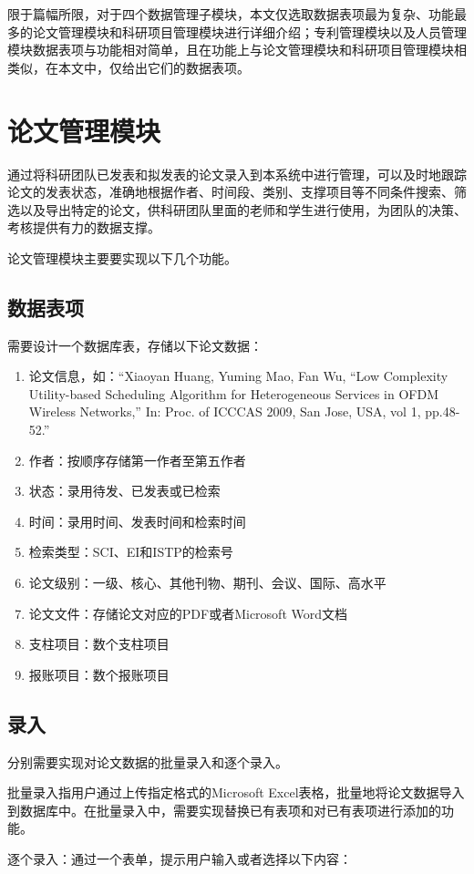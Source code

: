 限于篇幅所限，对于四个数据管理子模块，本文仅选取数据表项最为复杂、功能最多的论文管理模块和科研项目管理模块进行详细介绍；专利管理模块以及人员管理模块数据表项与功能相对简单，且在功能上与论文管理模块和科研项目管理模块相类似，在本文中，仅给出它们的数据表项。
\section{论文管理模块}

通过将科研团队已发表和拟发表的论文录入到本系统中进行管理，可以及时地跟踪论文的发表状态，准确地根据作者、时间段、类别、支撑项目等不同条件搜索、筛选以及导出特定的论文，供科研团队里面的老师和学生进行使用，为团队的决策、考核提供有力的数据支撑。

论文管理模块主要要实现以下几个功能。

\subsection{数据表项}
需要设计一个数据库表，存储以下论文数据：
\begin{enumerate}
\item 论文信息，如：“Xiaoyan Huang, Yuming Mao, Fan Wu, ``Low Complexity Utility-based Scheduling Algorithm for Heterogeneous Services in OFDM Wireless Networks,'' In: Proc. of ICCCAS 2009, San Jose, USA, vol 1, pp.48-52.”
\item 作者：按顺序存储第一作者至第五作者
\item 状态：录用待发、已发表或已检索
\item 时间：录用时间、发表时间和检索时间
\item 检索类型：SCI、EI和ISTP的检索号
\item 论文级别：一级、核心、其他刊物、期刊、会议、国际、高水平
\item 论文文件：存储论文对应的PDF或者Microsoft Word文档
\item 支柱项目：数个支柱项目
\item 报账项目：数个报账项目
\end{enumerate}

\subsection{录入}
分别需要实现对论文数据的批量录入和逐个录入。

批量录入指用户通过上传指定格式的Microsoft Excel表格，批量地将论文数据导入到数据库中。在批量录入中，需要实现替换已有表项和对已有表项进行添加的功能。

逐个录入：通过一个表单，提示用户输入或者选择以下内容：

